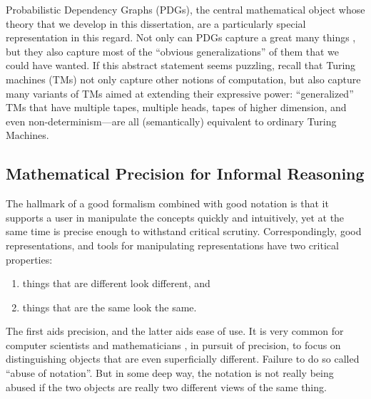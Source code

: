 

Probabilistic Dependency Graphs (PDGs), the central mathematical object whose theory that we develop in this dissertation, are a particularly special representation in this regard. 
Not only can PDGs capture a great many things 
\unskip, but they also capture most of the ``obvious generalizations'' of them that we could have wanted. 
If this abstract statement seems puzzling, recall that Turing machines (TMs) not only capture other notions of computation, but also capture many variants of TMs aimed at extending their expressive power: ``generalized'' TMs that have multiple tapes, multiple heads, tapes of higher dimension, and even non-determinism---are all (semantically) equivalent to ordinary Turing Machines. 


\subsection{Mathematical Precision for Informal Reasoning}

%
%
The hallmark of a good formalism combined with good notation is that it supports a user in manipulate the concepts quickly and intuitively, yet at the same time is precise enough to withstand critical scrutiny.
%
Correspondingly, good representations, and tools for manipulating representations 
    have two critical properties:
\begin{enumerate}
    \item things that are different look different, and
    \item things that are the same look the same. 
\end{enumerate}
The first aids precision, and the latter aids ease of use. 
It is very common for computer scientists and mathematicians 
    \unskip,
    in pursuit of precision,
    to focus on distinguishing objects that are even superficially different.  
Failure to do so called ``abuse of notation''. 
%
But in some deep way, the notation is not really being abused if the two objects are really two different views of the same thing.


